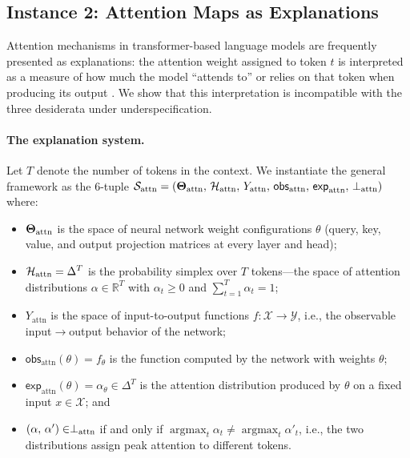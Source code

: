 \subsection{Instance 2: Attention Maps as Explanations}
\label{sec:instance-attention}

Attention mechanisms in transformer-based language models are frequently
presented as explanations: the attention weight assigned to token $t$ is
interpreted as a measure of how much the model ``attends to'' or relies on
that token when producing its output \citep{jainwallace2019}.  We show that
this interpretation is incompatible with the three desiderata under
underspecification.

\paragraph{The explanation system.}
Let $T$ denote the number of tokens in the context.  We instantiate the
general framework as the 6-tuple
$\mathcal{S}_{\mathrm{attn}} = (\mathbf{\Theta}_{\mathrm{attn}},\,\mathcal{H}_{\mathrm{attn}},\,Y_{\mathrm{attn}},\,\mathsf{obs}_{\mathrm{attn}},\,\mathsf{exp}_{\mathrm{attn}},\,\perp_{\mathrm{attn}})$
where:
\begin{itemize}
  \item $\mathbf{\Theta}_{\mathrm{attn}}$ is the space of neural network weight
    configurations $\theta$ (query, key, value, and output projection matrices
    at every layer and head);
  \item $\mathcal{H}_{\mathrm{attn}} = \Delta^T$ is the probability simplex over $T$
    tokens---the space of attention distributions $\alpha \in \mathbb{R}^T$
    with $\alpha_t \geq 0$ and $\sum_{t=1}^T \alpha_t = 1$;
  \item $Y_{\mathrm{attn}}$ is the space of input-to-output functions
    $f : \mathcal{X} \to \mathcal{Y}$, i.e., the observable
    input$\to$output behavior of the network;
  \item $\mathsf{obs}_{\mathrm{attn}}(\theta) = f_\theta$ is the function
    computed by the network with weights $\theta$;
  \item $\mathsf{exp}_{\mathrm{attn}}(\theta) = \alpha_\theta \in \Delta^T$
    is the attention distribution produced by $\theta$ on a fixed input
    $x \in \mathcal{X}$; and
  \item $(\alpha,\,\alpha') \in \perp_{\mathrm{attn}}$ if and only if
    $\operatorname{argmax}_t \alpha_t \neq \operatorname{argmax}_t \alpha'_t$,
    i.e., the two distributions assign peak attention to different tokens.
\end{itemize}

